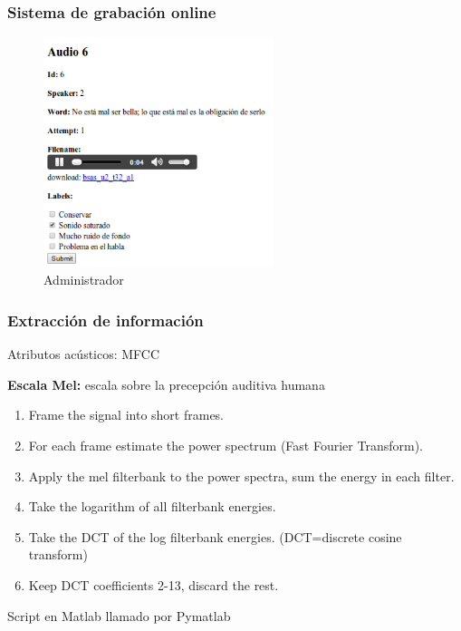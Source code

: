 \documentclass[mathserif]{beamer}%
\begin{document}
\begin{frame}[noframenumbering]
	\frametitle{Sistema de grabación online}
	
	\begin{figure}[h!]
		\centerline{\includegraphics[width=0.6\textwidth]{categorizando_audios} }
		\caption{Administrador}
		\label{figEncuesta}
	\end{figure}
\end{frame}

\begin{frame}[noframenumbering]
	\frametitle{Extracción de información}
	\Large {Atributos acústicos: MFCC}
	
	{\normalsize \textbf{Escala Mel:} escala sobre la precepción auditiva humana
		
		\begin{enumerate}[(1)]
			\item Frame the signal into short frames.
			\item For each frame estimate the power spectrum (Fast Fourier Transform).
			\item Apply the mel filterbank to the power spectra, sum the energy in each filter.
			\item Take the logarithm of all filterbank energies.
			\item Take the DCT of the log filterbank energies. (DCT=discrete cosine transform)
			\item Keep DCT coefficients 2-13, discard the rest.
		\end{enumerate}
		
		Script en Matlab llamado por Pymatlab
		
	}
\end{frame}
\end{document}

